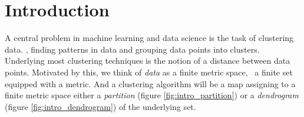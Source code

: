 \chapter*{Introduction}

A central problem in machine learning and data science is the task of clustering data. \Ie, finding patterns in data and grouping data points into clusters.
Underlying most clustering techniques is the notion of a distance between data points. Motivated by this, we think of \emph{data} as a finite metric space, \ie\ a finite set equipped with a metric.
And a clustering algorithm will be a map assigning to a finite metric space either a \emph{partition} (figure \ref{fig:intro_partition}) or a \emph{dendrogram} (figure \ref{fig:intro_dendrogram}) of the underlying set.

